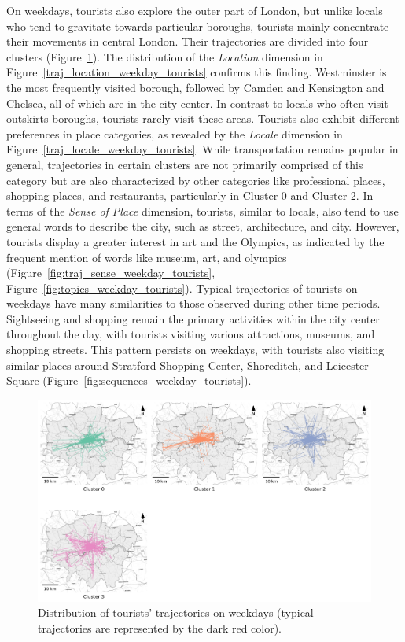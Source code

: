 \documentclass{article}
\theoremstyle{remark}
\begin{document}
On weekdays, tourists also explore the outer part of London, but unlike locals who tend to gravitate towards particular boroughs, tourists mainly concentrate their movements in central London. Their trajectories are divided into four clusters (Figure~\ref{fig:traj_distribution_weekday_tourists}). The distribution of the \textit{Location} dimension in Figure~\ref{traj_location_weekday_tourists} confirms this finding. Westminster is the most frequently visited borough, followed by Camden and Kensington and Chelsea, all of which are in the city center. In contrast to locals who often visit outskirts boroughs, tourists rarely visit these areas. Tourists also exhibit different preferences in place categories, as revealed by the \textit{Locale} dimension in Figure~\ref{traj_locale_weekday_tourists}. While transportation remains popular in general, trajectories in certain clusters are not primarily comprised of this category but are also characterized by other categories like professional places, shopping places, and restaurants, particularly in Cluster 0 and Cluster 2. In terms of the \textit{Sense of Place} dimension, tourists, similar to locals, also tend to use general words to describe the city, such as street, architecture, and city. However, tourists display a greater interest in art and the Olympics, as indicated by the frequent mention of words like museum, art, and olympics (Figure~\ref{fig:traj_sense_weekday_tourists}, Figure~\ref{fig:topics_weekday_tourists}). Typical trajectories of tourists on weekdays have many similarities to those observed during other time periods. Sightseeing and shopping remain the primary activities within the city center throughout the day, with tourists visiting various attractions, museums, and shopping streets. This pattern persists on weekdays, with tourists also visiting similar places around Stratford Shopping Center, Shoreditch, and Leicester Square (Figure~\ref{fig:sequences_weekday_tourists}).

\begin{figure}[!h]
\centering
\includegraphics[width=1\textwidth]{figures/traj_distribution_weekday_tourists.png}
\caption{\label{fig:traj_distribution_weekday_tourists}Distribution of tourists' trajectories on weekdays (typical trajectories are represented by the dark red color).}
\end{figure}
\end{document}
